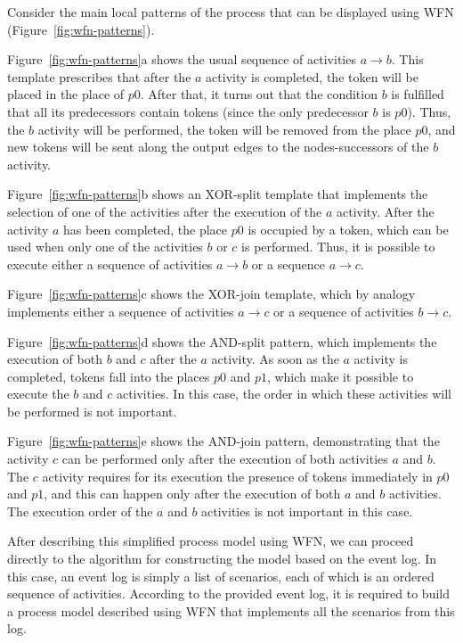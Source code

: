\documentclass[
11pt,%
tightenlines,%
twoside,%
onecolumn,%
nofloats,%
nobibnotes,%
nofootinbib,%
superscriptaddress,%
noshowpacs,%
centertags]%
{revtex4}
\begin{document}
Consider the main local patterns of the process that can be displayed using WFN (Figure~\ref{fig:wfn-patterns}).

Figure~\ref{fig:wfn-patterns}a shows the usual sequence of activities $a \rightarrow b$.
This template prescribes that after the $a$ activity is completed, the token will be placed in the place of $p0$.
After that, it turns out that the condition $b$ is fulfilled that all its predecessors contain tokens (since the only predecessor $b$ is $p0$).
Thus, the $b$ activity will be performed, the token will be removed from the place $p0$, and new tokens will be sent along the output edges to the nodes-successors of the $b$ activity.
     
Figure~\ref{fig:wfn-patterns}b shows an XOR-split template that implements the selection of one of the activities after the execution of the $a$ activity.
After the activity $a$ has been completed, the place $p0$ is occupied by a token, which can be used when only one of the activities $b$ or $c$ is performed.
Thus, it is possible to execute either a sequence of activities $a \rightarrow b$ or a sequence $a \rightarrow c$.

Figure~\ref{fig:wfn-patterns}c shows the XOR-join template, which by analogy implements either a sequence of activities $a \rightarrow c$ or a sequence of activities $b \rightarrow c$.

Figure~\ref{fig:wfn-patterns}d shows the AND-split pattern, which implements the execution of both $b$ and $c$ after the $a$ activity.
As soon as the $a$ activity is completed, tokens fall into the places $p0$ and $p1$, which make it possible to execute the $b$ and $c$ activities.
In this case, the order in which these activities will be performed is not important.

Figure~\ref{fig:wfn-patterns}e shows the AND-join pattern, demonstrating that the activity $c$ can be performed only after the execution of both activities $a$ and $b$.
The $c$ activity requires for its execution the presence of tokens immediately in $p0$ and $p1$, and this can happen only after the execution of both $a$ and $b$ activities.
The execution order of the $a$ and $b$ activities is not important in this case.

After describing this simplified process model using WFN, we can proceed directly to the algorithm for constructing the model based on the event log.
In this case, an event log is simply a list of scenarios, each of which is an ordered sequence of activities.
According to the provided event log, it is required to build a process model described using WFN that implements all the scenarios from this log.
\end{document}
